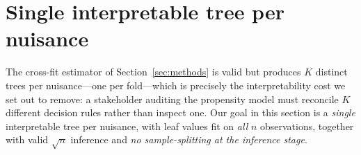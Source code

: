 %
%
%

\section{Single interpretable tree per nuisance}
\label{sec:rashomon}

The cross-fit estimator of Section~\ref{sec:methods} is valid but produces $K$
distinct trees per nuisance---one per fold---which is precisely the interpretability
cost we set out to remove: a stakeholder auditing the propensity model must reconcile
$K$ different decision rules rather than inspect one. Our goal in this section is a
\emph{single} interpretable tree per nuisance, with leaf values fit on \emph{all} $n$
observations, together with valid $\sqrt{n}$ inference and \emph{no sample-splitting
at the inference stage}.

